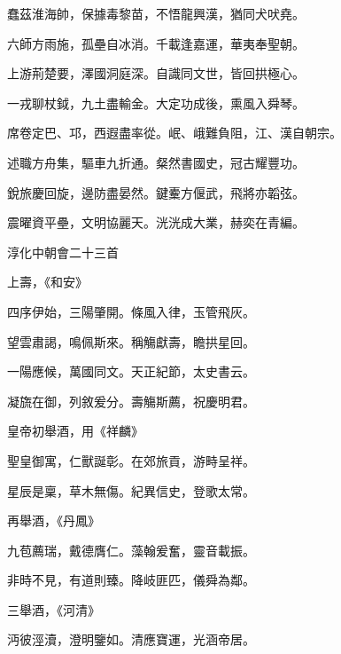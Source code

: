 \begin{pinyinscope}
 蠢茲淮海帥，保據毒黎苗，不悟龍興漢，猶同犬吠堯。



 六師方雨施，孤壘自冰消。千載逢嘉運，華夷奉聖朝。



 上游荊楚要，澤國洞庭深。自識同文世，皆回拱極心。



 一戎聊杖鉞，九土盡輸金。大定功成後，熏風入舜琴。



 席卷定巴、邛，西遐盡率從。岷、峨難負阻，江、漢自朝宗。



 述職方舟集，驅車九折通。粲然書國史，冠古耀豐功。



 銳旅慶回旋，邊防盡晏然。鍵櫜方偃武，飛將亦韜弦。



 震曜資平壘，文明協麗天。洸洸成大業，赫奕在青編。



 淳化中朝會二十三首



 上壽，《和安》



 四序伊始，三陽肇開。條風入律，玉管飛灰。



 望雲肅謁，鳴佩斯來。稱觴獻壽，瞻拱星回。



 一陽應候，萬國同文。天正紀節，太史書云。



 凝旒在御，列敘爰分。壽觴斯薦，祝慶明君。



 皇帝初舉酒，用《祥麟》



 聖皇御寓，仁獸誕彰。在郊旅貢，游畤呈祥。



 星辰是稟，草木無傷。紀異信史，登歌太常。



 再舉酒，《丹鳳》



 九苞薦瑞，戴德膺仁。藻翰爰奮，靈音載振。



 非時不見，有道則臻。降岐匪匹，儀舜為鄰。



 三舉酒，《河清》



 沔彼涇瀆，澄明鑒如。清應寶運，光涵帝居。




\end{pinyinscope}
